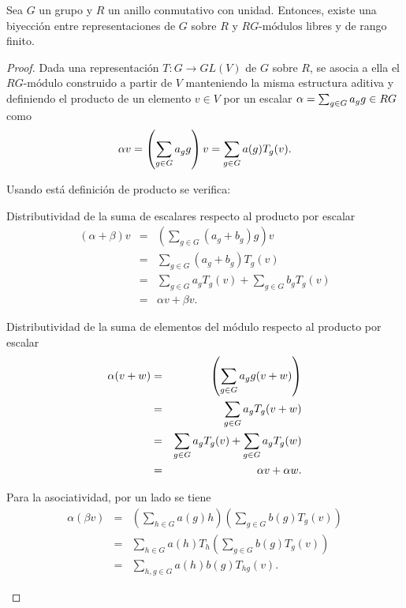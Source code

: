  \begin{proposicion}
 Sea $G$ un grupo y $R$ un anillo conmutativo con unidad. Entonces, existe una biyección entre representaciones de $G$ sobre $R$ y $RG\mbox{-módulos}$ libres y de rango finito. 
 \end{proposicion}
 \begin{proof}
 Dada una representación $T \colon G \to GL(V)$ de $G$ sobre $R$, se asocia a ella el $RG\mbox{-módulo}$ construido a partir de $V$ manteniendo la misma estructura aditiva y definiendo el producto de un elemento $v \in V$ por un escalar $\alpha = \sum_{g \in G} a_{g} g \in RG$ como 
 \begin{equation}\label{defproducto}
 \alpha v = \left( \sum_{g \in G} a_{g} g  \right)v = \sum_{g \in G}a(g)T_g(v).
 \end{equation}
 
 Usando está definición de producto se verifica:
 \begin{bulletList}
 \item Distributividad de la suma de escalares respecto al producto por escalar \begin{eqnarray*}
  (\alpha + \beta)v &=& \left( \sum_{g \in G}(a_g + b_g)g  \right)v \\
   &=& \sum_{g \in G}(a_g + b_g)T_g(v) \\
   &=& \sum_{g \in G}a_gT_g(v) + \sum_{g \in G}b_gT_g(v) \\
    &=& \alpha v + \beta v .
 \end{eqnarray*}
 \item Distributividad de la  suma de elementos del módulo respecto al producto por escalar
 \begin{eqnarray*}
 \alpha(v + w) &=& \left(\sum_{g \in G} a_{g} g(v + w)  \right) \\
  &=& \sum_{g \in G}a_gT_g(v+w) \\
  &=& \sum_{g \in G}a_gT_g(v) + \sum_{g \in G}a_gT_g(w) \\
  &=& \alpha v + \alpha w .
 \end{eqnarray*}
 \item Para la asociatividad, por un lado se tiene
 \begin{eqnarray*}
 \alpha(\beta v) &=& \left( \sum_{h \in G}a(g)h \right)\left( \sum_{g \in G}b(g)T_g(v) \right) \\
  &=& \sum_{h \in G}a(h)T_h\left( \sum_{g \in G}b(g)T_g(v)  \right) \\
  &=& \sum_{h, g \in G}a(h)b(g)T_{hg}(v).
 \end{eqnarray*}
 

\end{bulletList}
\end{proof}
